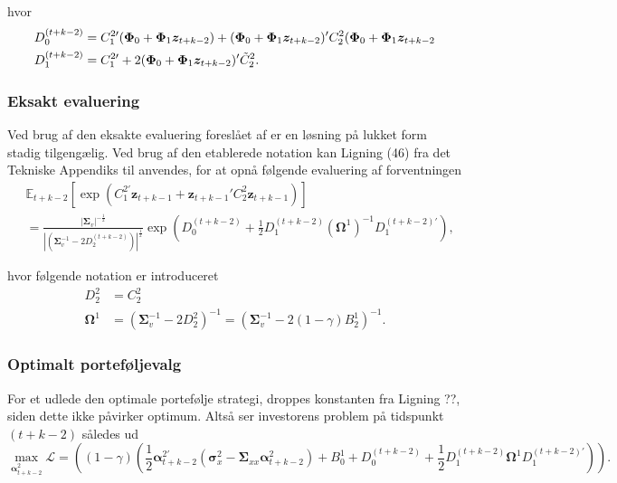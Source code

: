 \documentclass[
  a4paper,
  oneside]{memoir}
\begin{document}
hvor
\begin{align*}
D_0^{(t+k-2)}&=C_1^{2\prime} (\bm{\Phi}_0+\bm{\Phi}_1\bm{z}_{t+k-2} ) + (\bm{\Phi}_0+\bm{\Phi}_1\bm{z}_{t+k-2} )' C_2^2 (\bm{\Phi}_0+\bm{\Phi}_1\bm{z}_{t+k-2} \\
D_1^{(t+k-2)}&=C_1^{2\prime} + 2(\bm{\Phi}_0+\bm{\Phi}_1\bm{z}_{t+k-2})' \Tilde{C}_2^{2}.
\end{align*}

\hypertarget{eksakt-evaluering}{%
\subsubsection{Eksakt evaluering}\label{eksakt-evaluering}}

Ved brug af den eksakte evaluering foreslået af \citep{CampVicCha2003} er en løsning på lukket form stadig tilgengælig. Ved brug af den etablerede notation kan Ligning (46) fra det Tekniske Appendiks til \citep{CampVicCha2003} anvendes, for at opnå følgende evaluering af forventningen
\begin{align*}
&\mathbb{E}_{t+k-2}[ \exp( C_1^{2\prime} \bm{z}_{t+k-1} + \bm{z}_{t+k-1}' C_2^2 \bm{z}_{t+k-1} ) ]\\
&= \frac{\left| \bm{\Sigma}_v \right|^{-\tfrac{1}{2}}}{\left| (\bm{\Sigma}_v^{-1} - 2 D_2^{(t+k-2)}) \right|^{\tfrac{1}{2}}}\exp(D_0^{(t+k-2)} + \frac{1}{2} D_1^{(t+k-2)} (\bm{\Omega}^1)^{-1} D_1^{(t+k-2)\prime}),
\end{align*}

hvor følgende notation er introduceret
\begin{align*}
D_2^2&=C_2^2\\
\bm{\Omega}^1&=(\bm{\Sigma}_v^{-1} - 2D_2^2)^{-1}=(\bm{\Sigma}_v^{-1}  - 2(1-\gamma) B_2^1)^{-1}.
\end{align*}

\hypertarget{optimalt-portefuxf8ljevalg}{%
\subsubsection{Optimalt porteføljevalg}\label{optimalt-portefuxf8ljevalg}}

For et udlede den optimale portefølje strategi, droppes konstanten fra Ligning ??, siden dette ikke påvirker optimum. Altså ser investorens problem på tidspunkt \((t+k-2)\) således ud
\[\max_{\bm{\alpha}_{t+k-2}^2}\mathcal{L}= ( (1-\gamma) (\frac{1}{2}\bm{\alpha}_{t+k-2}^{2\prime} (\bm{\sigma}_x^2 - \bm{\Sigma}_{xx}\bm{\alpha}_{t+k-2}^2) + B_0^1 + D_0^{(t+k-2)} + \frac{1}{2} D_1^{(t+k-2)} \bm{\Omega}^1 D_1^{(t+k-2)\prime})).\]
\end{document}
